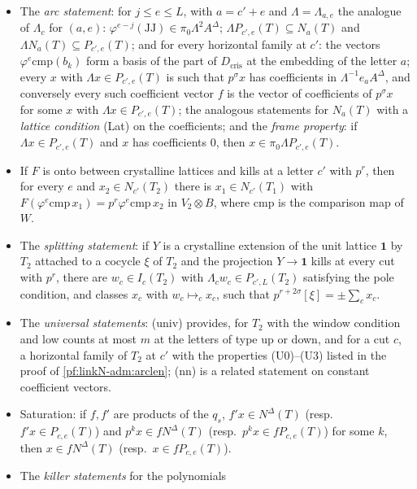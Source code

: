 \begin{definition}
\begin{itemize}
\item[(arc)] The \emph{arc statement}: for $j\le e\le L$, with $a=c'+e$ and $\Lambda=\Lambda_{a,e}$ the analogue of
  $\Lambda_c$ for $(a,e)$: $\varphi^{e-j}(\mathrm{JJ})\in\pi_0\Lambda^2A^\Delta$; $\Lambda P_{c',e}(T)\subseteq N_a(T)$ and
  $\Lambda N_a(T)\subseteq P_{c',e}(T)$; and for every horizontal family at $c'$: the vectors $\varphi^e\mathrm{cmp}(b_k)$
  form a basis of the part of $D_{\mathrm{cris}}$ at the embedding of the letter $a$; every $x$ with $\Lambda x\in
  P_{c',e}(T)$ is such that $p^\sigma x$ has coefficients in $\Lambda^{-1}e_aA^\Delta$, and conversely every such coefficient
  vector $f$ is the vector of coefficients of $p^\sigma x$ for some $x$ with $\Lambda x\in P_{c',e}(T)$; the analogous
  statements for $N_a(T)$ with a \emph{lattice condition} (Lat) on the coefficients; and the \emph{frame property}: if
  $\Lambda x\in P_{c',e}(T)$ and $x$ has coefficients $0$, then $x\in\pi_0\Lambda P_{c',e}(T)$.
\item[(arc$'$)] If $F$ is onto between crystalline lattices and kills at a letter $c'$ with $p^r$, then for every $e$ and
  $x_2\in N_{c'}(T_2)$ there is $x_1\in N_{c'}(T_1)$ with $F(\varphi^e\mathrm{cmp}\,x_1)=p^r\varphi^e\mathrm{cmp}\,x_2$
  in $V_2\otimes B$, where $\mathrm{cmp}$ is the comparison map of $W$.
\item[(split)] The \emph{splitting statement}: if $Y$ is a crystalline extension of the unit lattice $\mathbf 1$ by $T_2$
  attached to a cocycle $\xi$ of $T_2$ and the projection $Y\to\mathbf 1$ kills at every cut with $p^r$, there are
  $w_c\in I_c(T_2)$ with $\Lambda_cw_c\in P_{c',L}(T_2)$ satisfying the pole condition, and classes $x_c$ with
  $w_c\mapsto_cx_c$, such that $p^{r+2\sigma}[\xi]=\pm\sum_cx_c$.
\item[(univ), (nn)] The \emph{universal statements}: (univ) provides, for $T_2$ with the window condition and low counts
  at most $m$ at the letters of type up or down, and for a cut $c$, a horizontal family of $T_2$ at $c'$ with the
  properties (U0)--(U3) listed in the proof of \cref{pf:linkN-adm:arclen}; (nn) is a related statement on constant
  coefficient vectors.
\item[(sat), (sat$'$)] Saturation: if $f,f'$ are products of the $q_s$, $f'x\in N^\Delta(T)$ (resp.\ $f'x\in P_{c,e}(T)$)
  and $p^kx\in fN^\Delta(T)$ (resp.\ $p^kx\in fP_{c,e}(T)$) for some $k$, then $x\in fN^\Delta(T)$ (resp.\
  $x\in fP_{c,e}(T)$).
\item[(kill1), (kill2)] The \emph{killer statements} for the polynomials

\end{itemize}
\end{definition}

